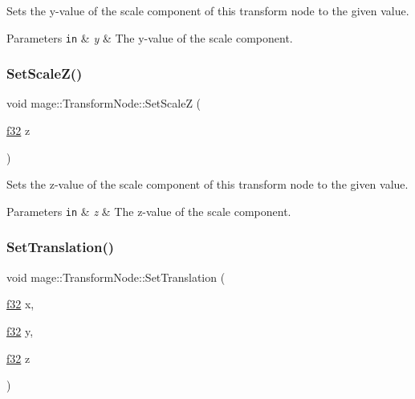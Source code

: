 Sets the y-\/value of the scale component of this transform node to the given value.


\begin{DoxyParams}[1]{Parameters}
\mbox{\tt in}  & {\em y} & The y-\/value of the scale component. \\
\hline
\end{DoxyParams}
\hypertarget{structmage_1_1_transform_node_ac3ab1b71a6e4a3196c35b3d092c967ae}{}\label{structmage_1_1_transform_node_ac3ab1b71a6e4a3196c35b3d092c967ae} 
\subsubsection{\texorpdfstring{Set\+Scale\+Z()}{SetScaleZ()}}
{\footnotesize\ttfamily void mage\+::\+Transform\+Node\+::\+Set\+ScaleZ (\begin{DoxyParamCaption}\item[{\hyperlink{namespacemage_a6a44ad388483959dc4dff9f2aef91431}{f32}}]{z }\end{DoxyParamCaption})\hspace{0.3cm}{\ttfamily [noexcept]}}

Sets the z-\/value of the scale component of this transform node to the given value.


\begin{DoxyParams}[1]{Parameters}
\mbox{\tt in}  & {\em z} & The z-\/value of the scale component. \\
\hline
\end{DoxyParams}
\hypertarget{structmage_1_1_transform_node_adf52cfc8b3a8c008833b5413731514fa}{}\label{structmage_1_1_transform_node_adf52cfc8b3a8c008833b5413731514fa} 
\subsubsection{\texorpdfstring{Set\+Translation()}{SetTranslation()}\hspace{0.1cm}{\footnotesize\ttfamily [1/4]}}
{\footnotesize\ttfamily void mage\+::\+Transform\+Node\+::\+Set\+Translation (\begin{DoxyParamCaption}\item[{\hyperlink{namespacemage_a6a44ad388483959dc4dff9f2aef91431}{f32}}]{x,  }\item[{\hyperlink{namespacemage_a6a44ad388483959dc4dff9f2aef91431}{f32}}]{y,  }\item[{\hyperlink{namespacemage_a6a44ad388483959dc4dff9f2aef91431}{f32}}]{z }\end{DoxyParamCaption})\hspace{0.3cm}{\ttfamily [noexcept]}}

